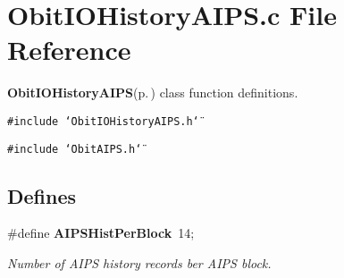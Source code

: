\section{Obit\-IOHistory\-AIPS.c File Reference}
\label{ObitIOHistoryAIPS_8c}
{\bf Obit\-IOHistory\-AIPS}{\rm (p.\,\pageref{structObitIOHistoryAIPS})} class function definitions. 

{\tt \#include \char`\"{}Obit\-IOHistory\-AIPS.h\char`\"{}}\par
{\tt \#include \char`\"{}Obit\-AIPS.h\char`\"{}}\par
\subsection*{Defines}
\begin{CompactItemize}
\item 
\#define {\bf AIPSHist\-Per\-Block}\ 14;
\begin{CompactList}\small\item\em Number of AIPS history records ber AIPS block. \item\end{CompactList}\end{CompactItemize}
